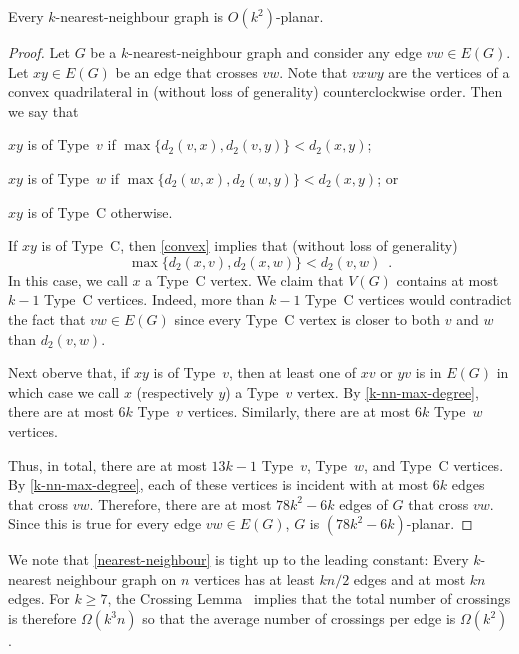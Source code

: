 \documentclass{patmorin}
\renewcommand{\ge}{\geqslant}
\begin{document}
\begin{lem}
\label{nearest-neighbour}
  Every $k$-nearest-neighbour graph is $O(k^2)$-planar.
\end{lem}

\begin{proof}
  Let $G$ be a $k$-nearest-neighbour graph and consider any edge $vw\in E(G)$.
  Let $xy\in E(G)$ be an edge that crosses $vw$.  Note that $vxwy$ are the vertices of a convex quadrilateral in (without loss of generality) counterclockwise order. Then we say that 
  \begin{compactenum}
    \item $xy$ is of Type~$v$ if $\max\{d_2(v,x), d_2(v,y)\}< d_2(x,y)$;
    \item $xy$ is of Type~$w$ if $\max\{d_2(w,x), d_2(w,y)\}< d_2(x,y)$; or
    \item $xy$ is of Type~C otherwise.
  \end{compactenum}
  If $xy$ is of Type~C, then \cref{convex} implies that (without loss of generality) 
  $$\max\{d_2(x,v),d_2(x,w)\} < d_2(v,w)\enspace.$$ 
   In this case, we call $x$ a Type~C vertex.  We claim that $V(G)$ contains at most $k-1$ Type~C vertices.  Indeed, more than $k-1$ Type~C vertices would contradict the fact that $vw\in E(G)$ since every Type~C vertex is closer to both $v$ and $w$ than $d_2(v,w)$.
  
  Next oberve that, if $xy$ is of Type~$v$, then at least one of $xv$ or $yv$ is in $E(G)$ in which case we call $x$ (respectively $y$) a Type~$v$ vertex.  By \cref{k-nn-max-degree}, there are at most $6k$ Type~$v$ vertices.  Similarly, there are at most $6k$ Type~$w$ vertices.
  
  Thus, in total, there are at most $13k-1$ Type~$v$, Type~$w$, and Type~C vertices. By \cref{k-nn-max-degree}, each of these vertices is incident with at most $6k$ edges that cross $vw$. Therefore, there are at most $78k^2-6k$ edges of $G$ that cross $vw$.  Since this is true for every edge $vw\in E(G)$, $G$ is $(78k^2-6k)$-planar.
\end{proof}

We note that \cref{nearest-neighbour} is tight up to the leading constant:  Every $k$-nearest neighbour graph on $n$ vertices has at least $kn/2$ edges and at most $kn$ edges.  For $k\ge 7$, the Crossing Lemma~\citep{ajtai.chvatal.ea:crossing-free,leighton:complexity} implies that the total number of crossings is therefore $\Omega(k^3n)$ so that the average number of crossings per edge is $\Omega(k^2)$.
\end{document}
